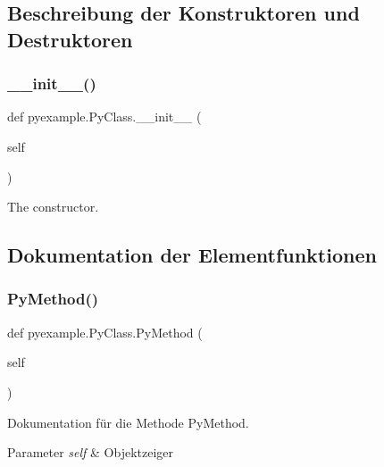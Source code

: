 \subsection{Beschreibung der Konstruktoren und Destruktoren}
\mbox{\label{classpyexample_1_1_py_class_a87e20fe7e81cb5a1c04e620c076ab8ac}} 
\subsubsection{\texorpdfstring{\+\_\+\+\_\+init\+\_\+\+\_\+()}{\_\_init\_\_()}}
{\footnotesize\ttfamily def pyexample.\+Py\+Class.\+\_\+\+\_\+init\+\_\+\+\_\+ (\begin{DoxyParamCaption}\item[{}]{self }\end{DoxyParamCaption})}



The constructor. 



\subsection{Dokumentation der Elementfunktionen}
\mbox{\label{classpyexample_1_1_py_class_a654596774eb28a0c6d26eea565de3a9d}} 
\subsubsection{\texorpdfstring{Py\+Method()}{PyMethod()}}
{\footnotesize\ttfamily def pyexample.\+Py\+Class.\+Py\+Method (\begin{DoxyParamCaption}\item[{}]{self }\end{DoxyParamCaption})}



Dokumentation für die Methode Py\+Method. 


\begin{DoxyParams}{Parameter}
{\em self} & Objektzeiger \\
\hline
\end{DoxyParams}


